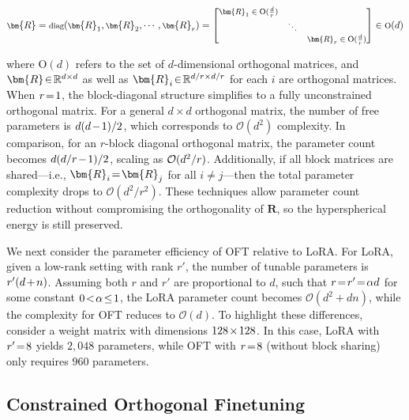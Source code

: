 \begin{equation}
    \footnotesize
    \bm{R}=\text{diag}(\bm{R}_1,\bm{R}_2,\cdots,\bm{R}_r)=\begin{bmatrix}
    \bm{R}_1\in \text{O}(\frac{d}{r}) &  &\\
    &\ddots & \\
    & & \bm{R}_r\in \text{O}(\frac{d}{r})
    \end{bmatrix}\in \text{O}(d)
\end{equation}

where $\text{O}(d)$ refers to the set of $d$-dimensional orthogonal matrices, and $\thickmuskip=2mu \medmuskip=2mu \bm{R}\in\mathbb{R}^{d\times d}$ as well as $\thickmuskip=2mu \medmuskip=2mu \bm{R}_i\in\mathbb{R}^{d/r\times d/r}$ for each $i$ are orthogonal matrices. When $\thickmuskip=2mu \medmuskip=2mu r=1$, the block-diagonal structure simplifies to a fully unconstrained orthogonal matrix. For a general $d\times d$ orthogonal matrix, the number of free parameters is $\thickmuskip=2mu \medmuskip=2mu d(d-1)/2$, which corresponds to $\mathcal{O}(d^2)$ complexity. In comparison, for an $r$-block diagonal orthogonal matrix, the parameter count becomes $\thickmuskip=2mu \medmuskip=2mu d(d/r-1)/2$, scaling as $\thickmuskip=2mu \medmuskip=2mu \mathcal{O}(d^2/r)$. Additionally, if all block matrices are shared—i.e., $\thickmuskip=2mu \medmuskip=2mu\bm{R}_i=\bm{R}_j$ for all $i\neq j$—then the total parameter complexity drops to $\mathcal{O}(d^2/r^2)$. These techniques allow parameter count reduction without compromising the orthogonality of $\bm{R}$, so the hyperspherical energy is still preserved.

We next consider the parameter efficiency of OFT relative to LoRA. For LoRA, given a low-rank setting with rank $r'$, the number of tunable parameters is $\thickmuskip=2mu \medmuskip=2mu r'(d+n)$. Assuming both $r$ and $r'$ are proportional to $d$, such that $\thickmuskip=2mu \medmuskip=2mu r = r' = \alpha d$ for some constant $\thickmuskip=2mu \medmuskip=2mu 0 < \alpha \leq 1$, the LoRA parameter count becomes $\mathcal{O}(d^2 + dn)$, while the complexity for OFT reduces to $\mathcal{O}(d)$. To highlight these differences, consider a weight matrix with dimensions $\thickmuskip=2mu \medmuskip=2mu 128\times128$. In this case, LoRA with $\thickmuskip=2mu \medmuskip=2mu r' = 8$ yields $2,048$ parameters, while OFT with $\thickmuskip=2mu \medmuskip=2mu r = 8$ (without block sharing) only requires $960$ parameters.

\subsection{Constrained Orthogonal Finetuning}

